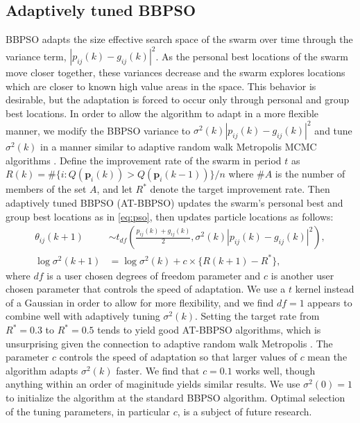 \documentclass[cmbright]{staauth}
\begin{document}
\subsection{Adaptively tuned BBPSO}\label{subsec:ATBBPSO}
BBPSO adapts the size effective search space of the swarm over time through the variance term, $|p_{ij}(k) - g_{ij}(k)|^2$. As the personal best locations of the swarm move closer together, these variances decrease and the swarm explores locations which are closer to known high value areas in the space. This behavior is desirable, but the adaptation is forced to occur only through personal and group best locations. In order to allow the algorithm to adapt in a more flexible manner, we modify the BBPSO variance to $\sigma^2(k)|p_{ij}(k) - g_{ij}(k)|^2$ and tune $\sigma^2(k)$ in a manner similar to adaptive random walk Metropolis MCMC algorithms \citep{andrieu2008tutorial}. Define the improvement rate of the swarm in period $t$ as $R(k) = \#\{i:Q(\bm{p}_i(k))> Q(\bm{p}_i(k-1))\}/n$ where $\#A$ is the number of members of the set $A$, and let $R^*$ denote the target improvement rate. Then adaptively tuned BBPSO (AT-BBPSO) updates the swarm's personal best and group best locations as in \eqref{eq:pso}, then updates particle locations as follows:
\begin{align}\label{eq:at-bbpso}
\theta_{ij}(k+1) &\sim t_{df}\left(\frac{p_{ij}(k) + g_{ij}(k)}{2}, \sigma^2(k)|p_{ij}(k) - g_{ij}(k)|^2\right),\nonumber\\
\log \sigma^2(k+1) &= \log\sigma^2(k) + c\times\{R(k+1) - R^*\},
\end{align}
where $df$ is a user chosen degrees of freedom parameter and $c$ is another user chosen parameter that controls the speed of adaptation. We use a $t$ kernel instead of a Gaussian in order to allow for more flexibility, and we find $df=1$ appears to combine well with adaptively tuning $\sigma^2(k)$. Setting the target rate from $R^*=0.3$ to $R^*=0.5$ tends to yield good AT-BBPSO algorithms, which is unsurprising given the connection to adaptive random walk Metropolis \citep{gelman1996efficient}. The parameter $c$ controls the speed of adaptation so that larger values of $c$ mean the algorithm adapts $\sigma^2(k)$ faster. We find that $c=0.1$ works well, though anything within an order of maginitude yields similar results. We use $\sigma^2(0)=1$ to initialize the algorithm at the standard BBPSO algorithm. Optimal selection of the tuning parameters, in particular $c$, is a subject of future research.
\end{document}
